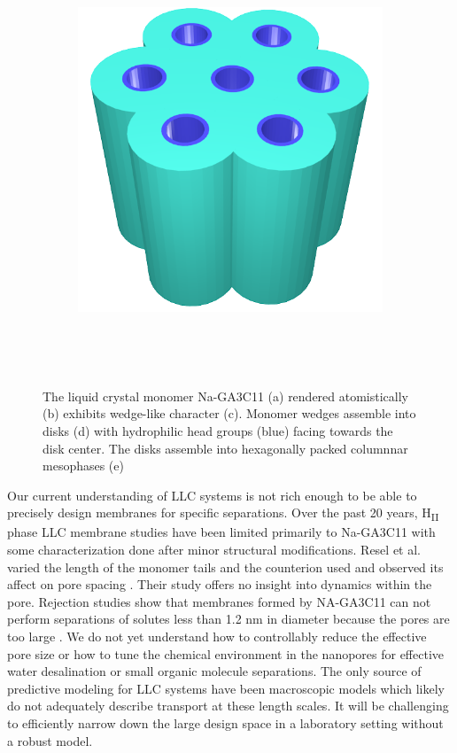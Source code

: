 \documentclass{article}
\begin{document}
\begin{figure}
\begin{subfigure}{0.4\linewidth}
		\centering
		\includegraphics[width=\textwidth]{hexagonal_packing.png}
		\caption{}~\label{fig:hex_packing_simple}
	\end{subfigure}
	\caption{The liquid crystal monomer Na-GA3C11 (a) rendered atomistically (b)
	exhibits wedge-like character (c). Monomer wedges assemble into disks (d) with
	hydrophilic head groups (blue) facing towards the disk center. The disks
	assemble into hexagonally packed columnnar mesophases (e)}~\label{fig:assembly}
  \end{figure}

  Our current understanding of LLC systems is not rich enough to be able to
  precisely design membranes for specific separations. Over the past 20 years,
  H\textsubscript{II} phase LLC membrane studies have been limited primarily to
  Na-GA3C11 with some characterization done after minor structural modifications.
  Resel et al. varied the length of the monomer tails and the counterion used and
  observed its affect on pore spacing \cite{resel_structural_2000}.  Their study
  offers no insight into dynamics within the pore. Rejection studies show that
  membranes formed by NA-GA3C11 can not perform separations of solutes less than
  1.2 nm in diameter because the pores are too large \cite{zhou_supported_2005}.
  We do not yet understand how to controllably reduce the effective pore size or
  how to tune the chemical environment in the nanopores for effective water
  desalination or small organic molecule separations. The only source of
  predictive modeling for LLC systems have been macroscopic models which likely
  do not adequately describe transport at these length scales.
  \cite{hatakeyama_water_2011} It will be challenging to efficiently narrow down
  the large design space in a laboratory setting without a robust model.
\end{document}
